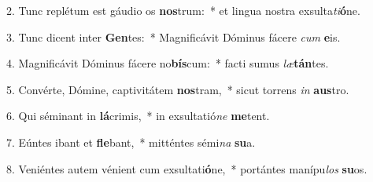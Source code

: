 2. Tunc replétum est gáudio os \textbf{nos}trum:~*  et lingua nostra exsulta\textit{ti}\textbf{ó}ne.\

3. Tunc dicent inter \textbf{Gen}tes:~*  Magnificávit Dóminus fácere \textit{cum} \textbf{e}is.\

4. Magnificávit Dóminus fácere no\textbf{bís}cum:~*  facti sumus \textit{læ}\textbf{tán}tes.\

5. Convérte, Dómine, captivitátem \textbf{nos}tram,~*  sicut torrens \textit{in} \textbf{aus}tro.\

6. Qui séminant in \textbf{lá}crimis,~*  in exsultatió\textit{ne} \textbf{me}tent.\

7. Eúntes ibant et \textbf{fle}bant,~*  mitténtes sémi\textit{na} \textbf{su}a.\

8. Veniéntes autem vénient cum exsultati\textbf{ó}ne,~*  portántes manípu\textit{los} \textbf{su}os.\

